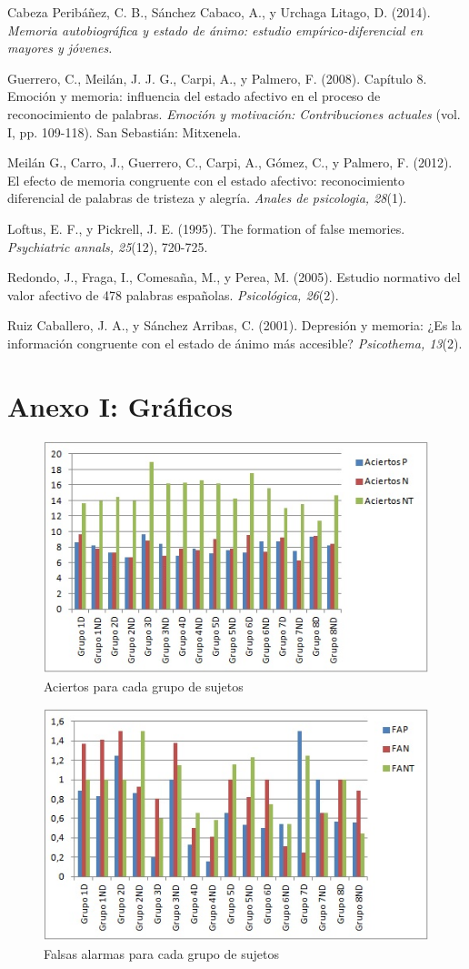 \documentclass[a4paper,11pt]{article}
\begin{document}
Cabeza Peribáñez, C. B., Sánchez Cabaco, A., y Urchaga Litago, D. (2014). \textit{Memoria autobiográfica y estado de ánimo: estudio empírico-diferencial en mayores y jóvenes.}

Guerrero, C., Meilán, J. J. G., Carpi, A., y Palmero, F. (2008). Capítulo 8. Emoción y memoria: influencia del estado afectivo en el proceso de reconocimiento de palabras.  \textit{Emoción y motivación: Contribuciones actuales} (vol. I, pp. 109-118). San Sebastián: Mitxenela.

 Meilán G.,  Carro, J., Guerrero, C., Carpi, A., Gómez, C., y Palmero, F. (2012). El efecto de memoria congruente con el estado afectivo: reconocimiento diferencial de palabras de tristeza y alegría. \textit{Anales de psicologia, 28}(1).
 
Loftus, E. F., y Pickrell, J. E. (1995). The formation of false memories. \textit{Psychiatric annals, 25}(12), 720-725.

Redondo, J., Fraga, I., Comesaña, M., y Perea, M. (2005). Estudio normativo del valor afectivo de 478 palabras españolas. \textit{Psicológica, 26}(2).

Ruiz Caballero, J. A., y Sánchez Arribas, C. (2001). Depresión y memoria: ¿Es la información congruente con el estado de ánimo más accesible? \textit{Psicothema, 13}(2).

\newpage

\section{Anexo I: Gráficos}
\begin{figure}[h!]
	\centering
	\includegraphics[width=0.55\linewidth]{informe1_1}
	\caption{Aciertos para cada grupo de sujetos}
\end{figure}

\begin{figure}[h!]
	\centering
	\includegraphics[width=0.55\linewidth]{informe1_2}
	\caption{Falsas alarmas para cada grupo de sujetos}
\end{figure}
\end{document}
